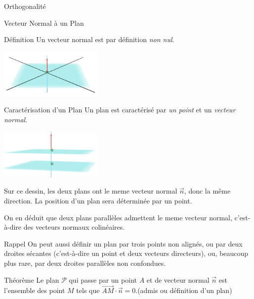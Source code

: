 \documentclass{cours}
\begin{document}
\begin{Gpartie}{Orthogonalité}
\begin{Spartie}{Vecteur Normal à un Plan}
\begin{SSpartie}{Définition}
                Un vecteur normal est par définition \emph{non nul}.
    
                \begin{center}
                        \includegraphics[width=5cm]{rsc/12fig3.png}
                    \parbox{\linewidth}{}
                \end{center}
            \end{SSpartie}
            \begin{SSpartie}{Caractérisation d'un Plan} 
                Un plan est caractérisé par \emph{un point} et un \emph{vecteur normal}.

                \begin{center}
                    \includegraphics[width=5cm]{rsc/12fig4.png}
                    \parbox{\linewidth}{}
                \end{center}
                
                                    Sur ce dessin, les deux plans ont le meme vecteur normal $\vec{n}$, donc la même direction. La position d'un plan sera déterminée par un point.
                
                                    On en déduit que deux plans parallèles admettent le meme vecteur normal, c'est-à-dire des vecteurs normaux colinéaires.
                \begin{SSSpartie}{Rappel} 
                    On peut aussi définir un plan par trois points non alignés, ou par deux droites sécantes (c'est-à-dire un point et deux vecteurs directeurs), ou, beaucoup plus rare, par deux droites parallèles non confondues.
                \end{SSSpartie}
            \end{SSpartie}
            \pagebreak
            \begin{SSpartie}{Théorème} 
                Le plan $\mathcal{P}$ qui passe par un point $A$ et de vecteur normal $\vec{n}$ est l'ensemble des point $M$ tels que $\overrightarrow{AM}\cdot\vec{n}=0$.\quad (admis ou définition d'un plan)


\end{SSpartie}
\end{Spartie}
\end{Gpartie}
\end{document}
